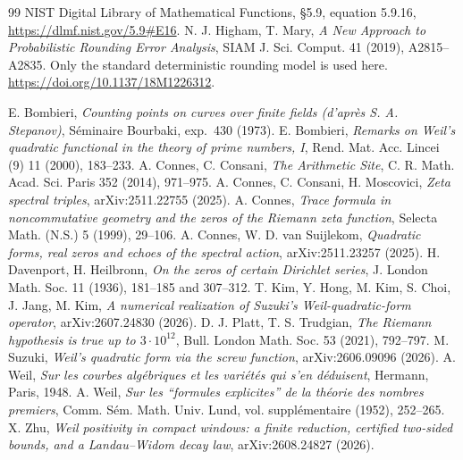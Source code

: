 \documentclass[11pt]{amsart}
\theoremstyle{remark}
\theoremstyle{definition}
\begin{document}
\enlargethispage{2\baselineskip}
\begin{thebibliography}{99}
 NIST Digital Library of Mathematical Functions, \S5.9, equation 5.9.16, \url{https://dlmf.nist.gov/5.9#E16}.
 N. J. Higham, T. Mary, \emph{A New Approach to Probabilistic Rounding Error Analysis}, SIAM J. Sci. Comput. 41 (2019), A2815--A2835. Only the standard deterministic rounding model is used here. \url{https://doi.org/10.1137/18M1226312}.

 E. Bombieri, \emph{Counting points on curves over finite fields (d'apr\`es S. A. Stepanov)}, S\'eminaire Bourbaki, exp.~430 (1973).
 E. Bombieri, \emph{Remarks on Weil's quadratic functional in the theory of prime numbers, I}, Rend. Mat. Acc. Lincei (9) 11 (2000), 183--233.
 A. Connes, C. Consani, \emph{The Arithmetic Site}, C. R. Math. Acad. Sci. Paris 352 (2014), 971--975.
 A. Connes, C. Consani, H. Moscovici, \emph{Zeta spectral triples}, arXiv:2511.22755 (2025).
 A. Connes, \emph{Trace formula in noncommutative geometry and the zeros of the Riemann zeta function}, Selecta Math. (N.S.) 5 (1999), 29--106.
 A. Connes, W. D. van Suijlekom, \emph{Quadratic forms, real zeros and echoes of the spectral action}, arXiv:2511.23257 (2025).
 H. Davenport, H. Heilbronn, \emph{On the zeros of certain Dirichlet series}, J. London Math. Soc. 11 (1936), 181--185 and 307--312.
 T. Kim, Y. Hong, M. Kim, S. Choi, J. Jang, M. Kim, \emph{A numerical realization of Suzuki's Weil-quadratic-form operator}, arXiv:2607.24830 (2026).
 D. J. Platt, T. S. Trudgian, \emph{The Riemann hypothesis is true up to $3\cdot10^{12}$}, Bull. London Math. Soc. 53 (2021), 792--797.
 M. Suzuki, \emph{Weil's quadratic form via the screw function}, arXiv:2606.09096 (2026).
 A. Weil, \emph{Sur les courbes alg\'ebriques et les vari\'et\'es qui s'en d\'eduisent}, Hermann, Paris, 1948.
 A. Weil, \emph{Sur les ``formules explicites'' de la th\'eorie des nombres premiers}, Comm. S\'em. Math. Univ. Lund, vol. suppl\'ementaire (1952), 252--265.
 X. Zhu, \emph{Weil positivity in compact windows: a finite reduction, certified two-sided bounds, and a Landau--Widom decay law}, arXiv:2608.24827 (2026).
\end{thebibliography}
\end{document}

